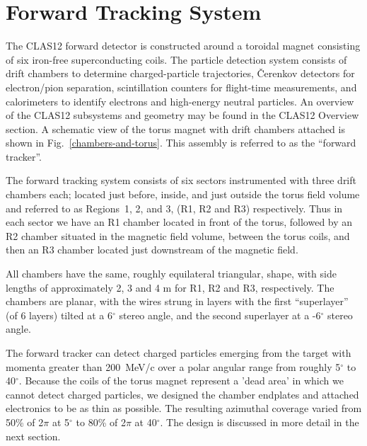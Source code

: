 \section{Forward Tracking System}
\label{overview}

The CLAS12 forward detector is constructed around a toroidal magnet consisting of six 
iron-free superconducting coils.  The particle detection system consists of drift 
chambers to determine charged-particle trajectories, {\v C}erenkov detectors 
for electron/pion separation, scintillation counters for flight-time 
measurements, and calorimeters to identify electrons and high-energy neutral 
particles.  An overview of the CLAS12 subsystems and geometry may be found in the 
CLAS12 Overview section.  A schematic view of the torus magnet with drift chambers
attached is shown in Fig.~\ref{chambers-and-torus}.   This assembly is referred to
as the ``forward tracker''. 

The forward tracking system consists of six sectors instrumented with three drift
chambers each; located just before, inside, 
and just outside the torus field volume and referred to as Regions~1, 2, 
and 3, (R1, R2 and R3) respectively.  Thus in each sector we have an R1 chamber located
in front of the torus, followed by an R2 chamber situated in the magnetic
field volume, between the torus coils, and then an R3 chamber located just
downstream of the magnetic field.

All chambers have the same, roughly equilateral triangular, shape, with
side lengths of approximately 2, 3 and 4 m for R1, R2 and R3, respectively.
The chambers are planar, with the wires strung in layers with the first 
``superlayer'' (of 6 layers)
tilted at a 6$^\circ$ stereo angle, and the second superlayer at a -6$^\circ$ stereo
angle.  

The forward tracker can detect charged particles emerging from the target with
momenta greater than 200~MeV/c over a polar angular range from roughly 5$^{\circ}$ to 
40$^{\circ}$.  Because the coils of the torus magnet represent a 'dead area'
in which we cannot detect charged particles, we designed the chamber endplates
and attached electronics to be as thin as possible.  The resulting azimuthal
coverage varied from 50\% of 2$\pi$ at 5$^{\circ}$ to 80\% of 2$\pi$ at 40$^{\circ}$.
The design is discussed in more detail in the next section.

